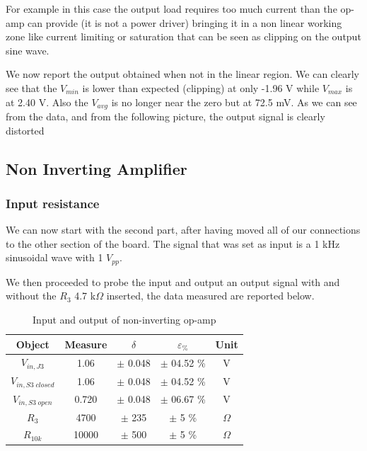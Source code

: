\documentclass[../main.tex]{subfiles}
\begin{document}
For example in this case the output load requires too much current than the op-amp can provide (it is not a power driver) bringing it in a non linear working zone like current limiting or saturation that can be seen as clipping on the output sine wave.

We now report the output obtained when not in the linear region.
We can clearly see that the $V_{min}$ is lower than expected (clipping) at only -1.96 V while $V_{max}$ is at 2.40 V. Also the $V_{avg}$ is no longer near the zero but at 72.5 mV.
As we can see from the data, and from the following picture, the output signal is clearly distorted



\subsection{Non Inverting Amplifier}



\subsubsection*{Input resistance}

We can now start with the second part, after having moved all of our connections to the other section of the board. The signal that was set as input is a 1 kHz sinusoidal wave with 1 $V_{pp}$.

We then proceeded to probe the input and output an output signal with and without the $R_3$ 4.7 k$\Omega$ inserted, the data measured are reported below.

\begin{table}[h!]
\centering	

\begin{tabular}{ccccc}
\textbf{Object} & \textbf{Measure}   & \textbf{$\delta$} & \textbf{$\varepsilon_{\%}$} & \textbf{Unit} \\

\hline
$V_{in,J3}$  &  1.06 & $\pm$ 0.048 & $\pm$ 04.52 \% &  V \\ 
\hline
$V_{in,S3\;closed}$  &  1.06 & $\pm$ 0.048 & $\pm$ 04.52 \% &  V \\ 
\hline
$V_{in,S3\;open}$  &  0.720 & $\pm$ 0.048 & $\pm$ 06.67 \% &  V \\
\hline
$R_{3}$  &  4700 & $\pm$ 235 & $\pm$ 5 \% & $\Omega$ \\
\hline
$R_{10k}$  & 10000 & $\pm$ 500 & $\pm$ 5 \% & $\Omega$ \\
\end{tabular}
\caption*{Input and output of non-inverting op-amp}
\end{table}
\end{document}
